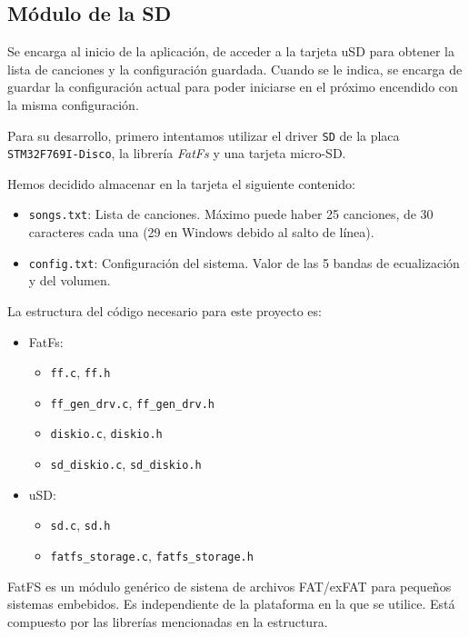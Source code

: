 \subsection{Módulo de la SD}

Se encarga al inicio de la aplicación, de acceder a la tarjeta uSD para obtener la lista de canciones y la configuración guardada. Cuando se le indica, se encarga de guardar la configuración actual para poder iniciarse en el próximo encendido con la misma configuración. 

Para su desarrollo, primero intentamos utilizar el driver \texttt{SD} de la placa \texttt{STM32F769I-Disco}, la librería \textit{FatFs} \cite{FatFsModuleApplication}\cite{FatFsGenericFAT} y una tarjeta micro-SD.

Hemos decidido almacenar en la tarjeta el siguiente contenido:
\begin{itemize}
	\item \texttt{songs.txt}: Lista de canciones. Máximo puede haber 25 canciones, de 30 caracteres cada una (29 en Windows debido al salto de línea). 
	\item \texttt{config.txt}: Configuración del sistema. Valor de las 5 bandas de ecualización y del volumen.
\end{itemize}


La estructura del código necesario para este proyecto es:
\begin{itemize}
\item FatFs:
\begin{itemize}
	\item \texttt{ff.c}, \texttt{ff.h}
	\item \texttt{ff\_gen\_drv.c}, \texttt{ff\_gen\_drv.h}
	\item \texttt{diskio.c}, \texttt{diskio.h}
	\item \texttt{sd\_diskio.c}, \texttt{sd\_diskio.h}
\end{itemize}
\item uSD:
\begin{itemize}
	\item \texttt{sd.c}, \texttt{sd.h}
	\item \texttt{fatfs\_storage.c}, \texttt{fatfs\_storage.h}
\end{itemize}

\end{itemize}

FatFS es un módulo genérico de sistena de archivos FAT/exFAT para pequeños sistemas embebidos. Es independiente de la plataforma en la que se utilice. Está compuesto por las librerías mencionadas en la estructura.

